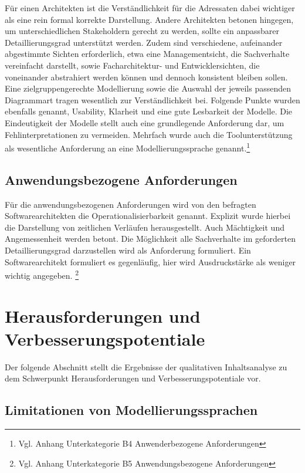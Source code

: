 Für einen Architekten ist die Verständlichkeit für die Adressaten dabei wichtiger als eine rein formal korrekte Darstellung.
Andere Architekten betonen hingegen, um unterschiedlichen Stakeholdern gerecht zu werden, sollte ein anpassbarer Detaillierungsgrad unterstützt werden. Zudem sind verschiedene, aufeinander abgestimmte Sichten erforderlich, etwa eine Managementsicht, die Sachverhalte vereinfacht darstellt, sowie Facharchitektur- und Entwicklersichten, die voneinander abstrahiert werden können und dennoch konsistent bleiben sollen. Eine zielgruppengerechte Modellierung sowie die Auswahl der jeweils passenden Diagrammart tragen wesentlich zur Verständlichkeit bei.
Folgende Punkte wurden ebenfalls genannt, Usability, Klarheit und eine gute Lesbarkeit der Modelle. Die Eindeutigkeit der Modelle stellt auch eine grundlegende Anforderung dar, um Fehlinterpretationen zu vermeiden.
Mehrfach wurde auch die Toolunterstützung als wesentliche Anforderung an eine Modellierungssprache genannt.\footnote{Vgl. Anhang Unterkategorie B4 Anwenderbezogene Anforderungen}

\subsection{Anwendungsbezogene Anforderungen}

Für die anwendungsbezogenen Anforderungen wird von den befragten Softwarearchitekten die Operationalisierbarkeit genannt. Explizit wurde hierbei die Darstellung von zeitlichen Verläufen herausgestellt. Auch Mächtigkeit und Angemessenheit werden betont. Die Möglichkeit alle Sachverhalte im geforderten Detaillierungsgrad darzustellen wird als Anforderung formuliert. 
Ein Softwarearchitekt formuliert es gegenläufig, hier wird Ausdruckstärke als weniger wichtig angegeben. \footnote{Vgl. Anhang Unterkategorie B5 Anwendungsbezogene Anforderungen}

\section{Herausforderungen und Verbesserungspotentiale}

Der folgende Abschnitt stellt die Ergebnisse der qualitativen Inhaltsanalyse zu dem Schwerpunkt Herausforderungen und Verbesserungspotentiale vor.

\subsection{Limitationen von Modellierungssprachen} 

